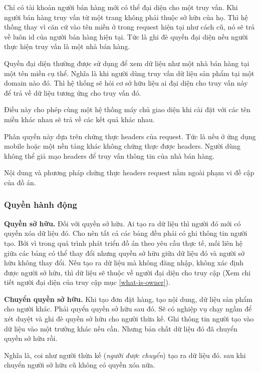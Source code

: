 	Chỉ có tài khoản người bán hàng mới có thể đại diện cho một truy vấn. Khi người bán hàng truy vấn từ một trang không phải thuộc sở hữu của họ. Thì hệ thống thay vì căn cứ vào tên miền ở trong \gls{request} hiện tại như cách cũ, nó sẽ trả về luôn \gls{id} của người bán hàng hiện tại. Tức là ghi đè quyền đại diện nếu người thực hiện truy vấn là một nhà bán hàng.
	
	Quyền đại diện thường được sử dụng để xem dữ liệu như một nhà bán hàng tại một tên miền cụ thể. Nghĩa là khi người dùng truy vấn dữ liệu sản phẩm tại một domain nào đó. Thì hệ thống sẽ hỏi cơ sở hữu liệu ai đại diện cho truy vấn này để trả về dữ liệu tương ứng cho truy vấn đó.
	
	Điều này cho phép cùng một hệ thống máy chủ giao diện khi cài đặt với các tên miền khác nhau sẽ trả về các kết quả khác nhau.
	
	Phân quyền này dựa trên chứng thực \gls{headers} của \gls{request}. Tức là nếu ở ứng dụng \gls{mobile} hoặc một nền tảng khác không chứng thực được \gls{headers}. Người dùng không thể giả mạo \gls{headers} để truy vấn thông tin của nhà bán hàng.
	
	Nội dung và phương pháp chứng thực \gls{headers} \gls{request} nằm ngoài phạm vi đề cập của đồ án.
	
	\subsubsection{Quyền hành động}
	
	\textbf{Quyền sở hữu.} Đối với quyền sở hữu. Ai tạo ra dữ liệu thì người đó mới có quyền xóa dữ liệu đó. Cho nên tất cả các bảng đều phải có ghi thông tin người tạo. Bởi vì trong quá trình phát triển đồ án theo yêu cầu thực tế, mối liên hệ giữa các bảng có thể thay đổi nhưng quyền sở hữu giữa dữ liệu đó và người sở hữu không thay đổi. Nếu tạo ra dữ liệu mà không đăng nhập, không xác định được người sở hữu, thì dữ liệu sẽ thuộc về người đại diện cho truy cập (Xem chi tiết người đại diện của truy cập mục \ref{what-is-owner}).
	
	\textbf{Chuyển quyền sở hữu.} Khi tạo đơn đặt hàng, tạo nội dung, dữ liệu sản phẩm cho người khác. Phải quyển quyền sở hữu sau đó. Sẽ có nghiệp vụ chạy ngầm để xét duyệt và ghi đè quyền sở hữu cho người thừa kế. Ghi thông tin người tạo vào dữ liệu vào một trường khác nếu cần. Nhưng bản chất dữ liệu đó đã chuyển quyền sở hữu rồi.
	
	Nghĩa là, coi như người thừa kế (\emph{người được chuyển}) tạo ra dữ liệu đó. sau khi chuyển người sở hữu cũ không có quyền xóa nữa.
	
